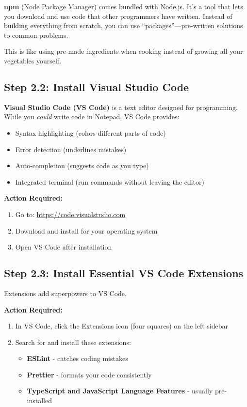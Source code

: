 \documentclass[12pt,a4paper]{article}
\begin{document}
\begin{concept}
\textbf{npm} (Node Package Manager) comes bundled with Node.js. It's a tool that lets you download and use code that other programmers have written. Instead of building everything from scratch, you can use ``packages''---pre-written solutions to common problems.

This is like using pre-made ingredients when cooking instead of growing all your vegetables yourself.
\end{concept}

\subsection{Step 2.2: Install Visual Studio Code}

\textbf{Visual Studio Code (VS Code)} is a text editor designed for programming. While you \textit{could} write code in Notepad, VS Code provides:
\begin{itemize}
    \item Syntax highlighting (colors different parts of code)
    \item Error detection (underlines mistakes)
    \item Auto-completion (suggests code as you type)
    \item Integrated terminal (run commands without leaving the editor)
\end{itemize}

\textbf{Action Required:}
\begin{enumerate}
    \item Go to: \url{https://code.visualstudio.com}
    \item Download and install for your operating system
    \item Open VS Code after installation
\end{enumerate}

\subsection{Step 2.3: Install Essential VS Code Extensions}

Extensions add superpowers to VS Code.

\textbf{Action Required:}
\begin{enumerate}
    \item In VS Code, click the Extensions icon (four squares) on the left sidebar
    \item Search for and install these extensions:
    \begin{itemize}
        \item \textbf{ESLint} - catches coding mistakes
        \item \textbf{Prettier} - formats your code consistently
        \item \textbf{TypeScript and JavaScript Language Features} - usually pre-installed
    \end{itemize}
\end{enumerate}
\end{document}
